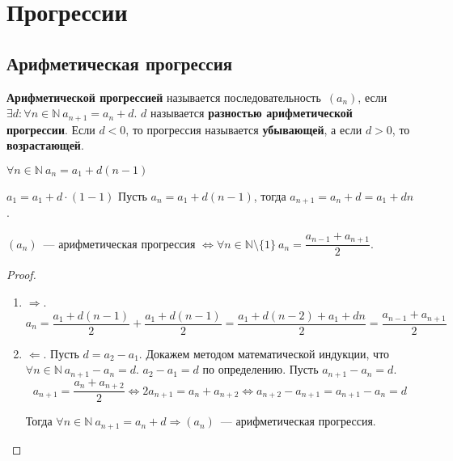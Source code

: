 \section{Прогрессии}
\subsection{Арифметическая прогрессия}
 \textbf{Арифметической прогрессией} называется последовательность~$(a_n)$, если $\exists d \colon \forall n \in \mathbb N \ a_{n+1} = a_n + d$.
$d$ называется \textbf{разностью арифметической прогрессии}.
Если $d < 0$, то прогрессия называется \textbf{убывающей}, а если $d > 0$, то \textbf{возрастающей}.

\begin{statement}
$\forall n \in \mathbb N \ a_n = a_1 + d(n - 1)$
\end{statement}
\begin{proofmathind}
	\indbase $a_1 = a_1 + d \cdot (1 - 1)$
	\indstep Пусть $a_n = a_1 + d(n - 1)$, тогда $a_{n+1} = a_n + d = a_1 + dn$. \indend
\end{proofmathind}

\begin{theorem}
$(a_n)$~--- арифметическая прогрессия $\Leftrightarrow \forall n \in \mathbb N \setminus \{ 1 \} \ a_n = \dfrac{a_{n-1} + a_{n+1}}2$.
\end{theorem}
\begin{proof}
\begin{enumerate}
	\item $\Rightarrow$.
	\begin{equation*}
	a_n = \frac{a_1 + d(n - 1)}2 + \frac{a_1 + d(n - 1)}2 =
	\frac{a_1 + d(n - 2) + a_1 + dn}2 =
	\frac{a_{n-1} + a_{n+1}}2
	\end{equation*}
	
	\item $\Leftarrow$. Пусть $d = a_2 - a_1$.
	Докажем методом математической индукции, что $\forall n \in \mathbb N \ a_{n+1} - a_n = d$.
		\indbase $a_2 - a_1 = d$ по определению.
		\indstep Пусть $a_{n+1} - a_n = d$.
		\begin{equation*}
		a_{n+1} = \frac{a_n + a_{n+2}}2 \Leftrightarrow
		2 a_{n+1} = a_n + a_{n+2} \Leftrightarrow
		a_{n+2} - a_{n+1} = a_{n+1} - a_n = d
		\end{equation*}
		\indend
		
	Тогда $\forall n \in \mathbb N \ a_{n+1} = a_n + d \Rightarrow (a_n)$~--- арифметическая прогрессия.
\end{enumerate}
\end{proof}

